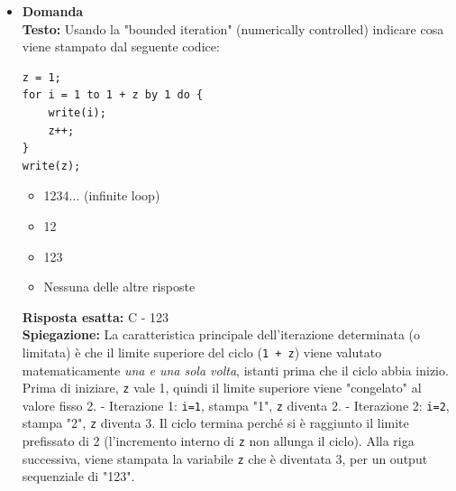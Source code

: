 \documentclass[12pt, a4paper]{article}
\newcounter{domandateoria}
\begin{document}
\begin{itemize}
    \item {}\textbf{Domanda \thedomandateoria} \\
    \textbf{Testo:} Usando la "bounded iteration" (numerically controlled) indicare cosa viene stampato dal seguente codice:
\begin{verbatim}
z = 1;
for i = 1 to 1 + z by 1 do {
    write(i);
    z++;
}
write(z);
\end{verbatim}
    \begin{itemize}
        \item[A)] 1234... (infinite loop)
        \item[B)] 12
        \item[C)] 123
        \item[D)] Nessuna delle altre risposte
    \end{itemize}
    \textbf{Risposta esatta:} C - 123 \\
    \textbf{Spiegazione:} La caratteristica principale dell'iterazione determinata (o limitata) è che il limite superiore del ciclo (\texttt{1 + z}) viene valutato matematicamente \textit{una e una sola volta}, istanti prima che il ciclo abbia inizio. Prima di iniziare, \texttt{z} vale 1, quindi il limite superiore viene "congelato" al valore fisso 2.
    - Iterazione 1: \texttt{i=1}, stampa "1", \texttt{z} diventa 2.
    - Iterazione 2: \texttt{i=2}, stampa "2", \texttt{z} diventa 3.
    Il ciclo termina perché si è raggiunto il limite prefissato di 2 (l'incremento interno di \texttt{z} non allunga il ciclo). Alla riga successiva, viene stampata la variabile \texttt{z} che è diventata 3, per un output sequenziale di "123".
    \vspace{0.3cm}


\end{itemize}
\end{document}
